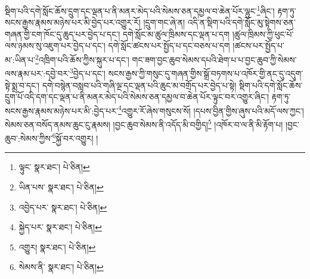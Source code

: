 སྡིག་པའི་དགེ་སློང་ཆོས་དྲུག་དང་ལྡན་པ་ནི་མནར་མེད་པའི་སེམས་ཅན་དམྱལ་བ་ཆེན་པོར་ལྷུང་\footnote{ལྟུང་  སྣར་ཐང་།  པེ་ཅིན། }ཞིང་། རྟག་ཏུ་སངས་རྒྱས་རྣམས་མཉེས་པར་མི་བྱེད་པར་འགྱུར་རོ། །དྲུག་གང་ཞེ་ན། འདི་ན་སྡིག་པའི་དགེ་སློང་མུ་སྟེགས་ཅན་གཞན་གྱི་ངག་ཁོང་དུ་ཆུད་པར་བྱེད་པ་དང་། དགེ་སློང་མ་ཚུལ་ཁྲིམས་དང་ལྡན་པ་དག །ཚུལ་ཁྲིམས་ཀྱི་ཕུང་པོ་ལས་ཉམས་སུ་འཇུག་པར་བྱེད་པ་དང་། དགེ་སློང་ཚངས་པར་སྤྱོད་པ་དང་བཅས་པ་དག །ཚངས་པར་སྤྱོད་པ་མ་:ཡིན་པ་\footnote{ཡིན་པས་  སྣར་ཐང་།  པེ་ཅིན། }འཁྲིག་པའི་ཆོས་ཀྱིས་སྐུར་པ་དང་། གང་ཟག་བྱང་ཆུབ་སེམས་དཔའི་ཐེག་པ་པ་བྱང་ཆུབ་ཀྱི་སེམས་ལས་རྣམ་པར་:དབྱེ་བར་\footnote{འབྱེད་པར་  སྣར་ཐང་།  པེ་ཅིན། }བྱེད་པ་དང་། སངས་རྒྱས་ཀྱི་གསུང་དུ་གཞན་གྱིས་སྒྲོ་བཏགས་པ་འཁོར་གྱི་ནང་དུ་འདུག་སྟེ་སྨྲ་བ་དང་། དགེ་བསྙེན་བསླབ་པའི་གཞི་ལྔ་དང་ལྡན་པའི་ཆུང་མ་བགྲོད་པར་བྱེད་པ་སྟེ། སྡིག་པའི་དགེ་སློང་ཆོས་དྲུག་པོ་འདི་དག་དང་ལྡན་པ་ནི་མནར་མེད་པའི་སེམས་ཅན་དམྱལ་བ་ཆེན་པོར་ལྟུང་བར་འགྱུར་ཞིང་། རྟག་ཏུ་སངས་རྒྱས་རྣམས་མཉེས་པར་མི་:བྱེད་པར་\footnote{སྐྱེད་པར་  སྣར་ཐང་།  པེ་ཅིན། }འགྱུར་རོ་ཞེས་གསུངས་སོ། །དཔས་བྱིན་གྱིས་ཞུས་པའི་མདོ་ལས་ཀྱང་། སེམས་ཅན་བསོད་ནམས་ཆུང་ངུ་རྣམས། །བྱང་ཆུབ་སེམས་ནི་འདོད་མི་བགྱིད།\footnote{འགྱུར།  སྣར་ཐང་།  པེ་ཅིན། } །འཁོར་བ་ལ་ནི་མི་རྟོག་པ། །བྱང་ཆུབ་:སེམས་ཀྱིས་\footnote{སེམས་ནི་  སྣར་ཐང་།  པེ་ཅིན། }སྐྱོ་བར་འགྱུར། །
